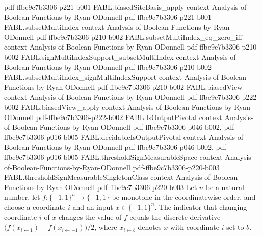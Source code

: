 \begin{theorem}
  {pdf-ffbe9c7b3306-p221-b001}
\proofstep
  {FABL.biasedSiteBasis_apply}
  {context}
  {Analysis-of-Boolean-Functions-by-Ryan-ODonnell}
  {pdf-ffbe9c7b3306-p221-b001}
\proofstep
  {FABL.subsetMultiIndex}
  {context}
  {Analysis-of-Boolean-Functions-by-Ryan-ODonnell}
  {pdf-ffbe9c7b3306-p210-b002}
\proofstep
  {FABL.subsetMultiIndex_eq_zero_iff}
  {context}
  {Analysis-of-Boolean-Functions-by-Ryan-ODonnell}
  {pdf-ffbe9c7b3306-p210-b002}
\proofstep
  {FABL.signMultiIndexSupport_subsetMultiIndex}
  {context}
  {Analysis-of-Boolean-Functions-by-Ryan-ODonnell}
  {pdf-ffbe9c7b3306-p210-b002}
\proofstep
  {FABL.subsetMultiIndex_signMultiIndexSupport}
  {context}
  {Analysis-of-Boolean-Functions-by-Ryan-ODonnell}
  {pdf-ffbe9c7b3306-p210-b002}
\proofstep
  {FABL.biasedView}
  {context}
  {Analysis-of-Boolean-Functions-by-Ryan-ODonnell}
  {pdf-ffbe9c7b3306-p222-b002}
\proofstep
  {FABL.biasedView_apply}
  {context}
  {Analysis-of-Boolean-Functions-by-Ryan-ODonnell}
  {pdf-ffbe9c7b3306-p222-b002}
\proofstep
  {FABL.IsOutputPivotal}
  {context}
  {Analysis-of-Boolean-Functions-by-Ryan-ODonnell}
  {pdf-ffbe9c7b3306-p046-b002,
    pdf-ffbe9c7b3306-p016-b005}
\proofstep
  {FABL.decidableIsOutputPivotal}
  {context}
  {Analysis-of-Boolean-Functions-by-Ryan-ODonnell}
  {pdf-ffbe9c7b3306-p046-b002,
    pdf-ffbe9c7b3306-p016-b005}
\proofstep
  {FABL.thresholdSignMeasurableSpace}
  {context}
  {Analysis-of-Boolean-Functions-by-Ryan-ODonnell}
  {pdf-ffbe9c7b3306-p220-b003}
\proofstep
  {FABL.thresholdSignMeasurableSingletonClass}
  {context}
  {Analysis-of-Boolean-Functions-by-Ryan-ODonnell}
  {pdf-ffbe9c7b3306-p220-b003}
Let $n$ be a natural number, let $f:\{-1,1\}^n\to\{-1,1\}$ be monotone in the
coordinatewise order, and choose a coordinate $i$ and an input $x\in\{-1,1\}^n$. The
indicator that changing coordinate $i$ of $x$ changes the value of $f$ equals the
discrete derivative $\bigl(f(x_{i\leftarrow 1})-f(x_{i\leftarrow -1})\bigr)/2$, where
$x_{i\leftarrow b}$ denotes $x$ with coordinate $i$ set to $b$.
\end{theorem}

